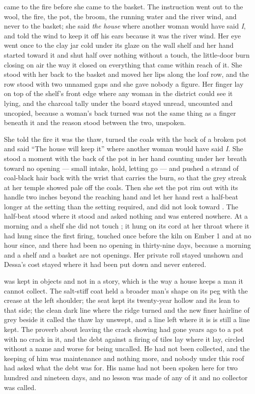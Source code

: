 \scenebreak

 came to the fire before she came to the basket. The instruction went out to the wool, the fire, the pot, the broom, the running water and the river wind, and never to the basket; she said \emph{the house} where another woman would have said \emph{I}, and told the wind to keep it off his ears because it was the river wind. Her eye went once to the clay jar cold under its glaze on the wall shelf and her hand started toward it and shut half over nothing without a touch, the little-door burn closing on air the way it closed on everything that came within reach of it. She stood with her back to the basket and moved her lips along the loaf row, and the row stood with two unnamed gaps and she gave nobody a figure. Her finger lay on top of the shelf's front edge where any woman in the district could see it lying, and the charcoal tally under the board stayed unread, uncounted and uncopied, because a woman's back turned was not the same thing as a finger beneath it and the reason stood between the two, unspoken.

She told the fire it was the thaw, turned the coals with the back of a broken pot and said “The house will keep it” where another woman would have said \emph{I}. She stood a moment with the back of the pot in her hand counting under her breath toward no opening --- small intake, hold, letting go --- and pushed a strand of coal-black hair back with the wrist that carries the burn, so that the grey streak at her temple showed pale off the coals. Then she set the pot rim out with its handle two inches beyond the reaching hand and let her hand rest a half-beat longer at the setting than the setting required, and did not look toward . The half-beat stood where it stood and asked nothing and was entered nowhere. At a morning and a shelf she did not touch ; it hung on its cord at her throat where it had hung since the first firing, touched once before the kiln on Ember 1 and at no hour since, and there had been no opening in thirty-nine days, because a morning and a shelf and a basket are not openings. Her private roll stayed unshown and Dessa's cost stayed where it had been put down and never entered.

 was kept in objects and not in a story, which is the way a house keeps a man it cannot collect. The salt-stiff coat held a broader man's shape on its peg with the crease at the left shoulder; the seat kept its twenty-year hollow and its lean to that side; the clean dark line where the  ridge turned and the new finer hairline of grey beside it called the thaw lay unswept, and a line left where it is is still a line kept. The proverb about leaving the crack showing had gone years ago to a pot with no crack in it, and the debt against a firing of tiles lay where it lay, circled without a name and worse for being uncalled. He had not been collected, and the keeping of him was maintenance and nothing more, and nobody under this roof had asked what the debt was for. His name had not been spoken here for two hundred and nineteen days, and no lesson was made of any of it and no collector was called.

